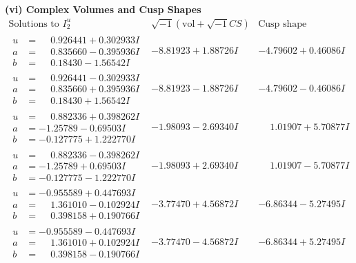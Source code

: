 \documentclass[1p]{elsarticle_modified}
\theoremstyle{definition}
\newcommand{\I}{\sqrt{-1}}
\begin{document}
\newpage\flushleft \textbf{(vi) Complex Volumes and Cusp Shapes}
$$\begin{array}{c|c|c}  
\text{Solutions to }I^u_{2}& \I (\text{vol} + \sqrt{-1}CS) & \text{Cusp shape}\\
 \hline 
\begin{aligned}
u &= \phantom{-}0.926441 + 0.302933 I \\
a &= \phantom{-}0.835660 - 0.395936 I \\
b &= \phantom{-}0.18430 - 1.56542 I\end{aligned}
 & -8.81923 + 1.88726 I & -4.79602 + 0.46086 I \\ \hline\begin{aligned}
u &= \phantom{-}0.926441 - 0.302933 I \\
a &= \phantom{-}0.835660 + 0.395936 I \\
b &= \phantom{-}0.18430 + 1.56542 I\end{aligned}
 & -8.81923 - 1.88726 I & -4.79602 - 0.46086 I \\ \hline\begin{aligned}
u &= \phantom{-}0.882336 + 0.398262 I \\
a &= -1.25789 - 0.69503 I \\
b &= -0.127775 + 1.222770 I\end{aligned}
 & -1.98093 - 2.69340 I & \phantom{-}1.01907 + 5.70877 I \\ \hline\begin{aligned}
u &= \phantom{-}0.882336 - 0.398262 I \\
a &= -1.25789 + 0.69503 I \\
b &= -0.127775 - 1.222770 I\end{aligned}
 & -1.98093 + 2.69340 I & \phantom{-}1.01907 - 5.70877 I \\ \hline\begin{aligned}
u &= -0.955589 + 0.447693 I \\
a &= \phantom{-}1.361010 - 0.102924 I \\
b &= \phantom{-}0.398158 + 0.190766 I\end{aligned}
 & -3.77470 + 4.56872 I & -6.86344 - 5.27495 I \\ \hline\begin{aligned}
u &= -0.955589 - 0.447693 I \\
a &= \phantom{-}1.361010 + 0.102924 I \\
b &= \phantom{-}0.398158 - 0.190766 I\end{aligned}
 & -3.77470 - 4.56872 I & -6.86344 + 5.27495 I \\ \hline\begin{aligned}

\end{aligned}
\end{array}$$
\end{document}
